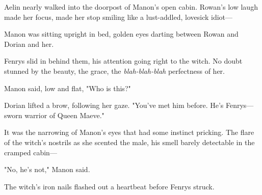 Aelin nearly walked into the doorpost of Manon's open cabin. Rowan's low laugh made her focus, made her stop smiling like a lust-addled, lovesick idiot---

Manon was sitting upright in bed, golden eyes darting between Rowan and Dorian and her.

Fenrys slid in behind them, his attention going right to the witch. No doubt stunned by the beauty, the grace, the \emph{blah-blah-blah}
perfectness of her.

Manon said, low and flat, "Who is this?"

Dorian lifted a brow, following her gaze. "You've met him before. He's Fenrys---sworn warrior of Queen Maeve."

It was the narrowing of Manon's eyes that had some instinct pricking. The flare of the witch's nostrils as she scented the male, his smell barely detectable in the cramped cabin---

"No, he's not," Manon said.

The witch's iron nails flashed out a heartbeat before Fenrys struck.
